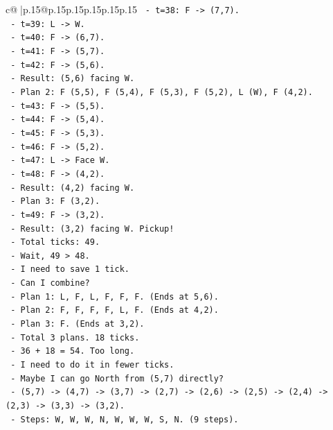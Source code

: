 \documentclass{article}
\begin{document}
{\begin{supertabular}{c@{$\;$}|p{.15\linewidth}@{}p{.15\linewidth}p{.15\linewidth}p{.15\linewidth}p{.15\linewidth}p{.15\linewidth}}
{{{\texttt{      {-} t=38: F {-}> (7,7).} \\
\texttt{      {-} t=39: L {-}> W.} \\
\texttt{      {-} t=40: F {-}> (6,7).} \\
\texttt{      {-} t=41: F {-}> (5,7).} \\
\texttt{      {-} t=42: F {-}> (5,6).} \\
\texttt{      {-} Result: (5,6) facing W.} \\
\texttt{    {-} Plan 2: F (5,5), F (5,4), F (5,3), F (5,2), L (W), F (4,2).} \\
\texttt{      {-} t=43: F {-}> (5,5).} \\
\texttt{      {-} t=44: F {-}> (5,4).} \\
\texttt{      {-} t=45: F {-}> (5,3).} \\
\texttt{      {-} t=46: F {-}> (5,2).} \\
\texttt{      {-} t=47: L {-}> Face W.} \\
\texttt{      {-} t=48: F {-}> (4,2).} \\
\texttt{      {-} Result: (4,2) facing W.} \\
\texttt{    {-} Plan 3: F (3,2).} \\
\texttt{      {-} t=49: F {-}> (3,2).} \\
\texttt{      {-} Result: (3,2) facing W. Pickup!} \\
\texttt{    {-} Total ticks: 49.} \\
\texttt{    {-} Wait, 49 > 48.} \\
\texttt{    {-} I need to save 1 tick.} \\
\texttt{    {-} Can I combine?} \\
\texttt{    {-} Plan 1: L, F, L, F, F, F. (Ends at 5,6).} \\
\texttt{    {-} Plan 2: F, F, F, F, L, F. (Ends at 4,2).} \\
\texttt{    {-} Plan 3: F. (Ends at 3,2).} \\
\texttt{    {-} Total 3 plans. 18 ticks.} \\
\texttt{    {-} 36 + 18 = 54. Too long.} \\
\texttt{    {-} I need to do it in fewer ticks.} \\
\texttt{    {-} Maybe I can go North from (5,7) directly?} \\
\texttt{    {-} (5,7) {-}> (4,7) {-}> (3,7) {-}> (2,7) {-}> (2,6) {-}> (2,5) {-}> (2,4) {-}> (2,3) {-}> (3,3) {-}> (3,2).} \\
\texttt{    {-} Steps: W, W, W, N, W, W, W, S, N. (9 steps).} \\
}}}
\end{supertabular}}
\end{document}
